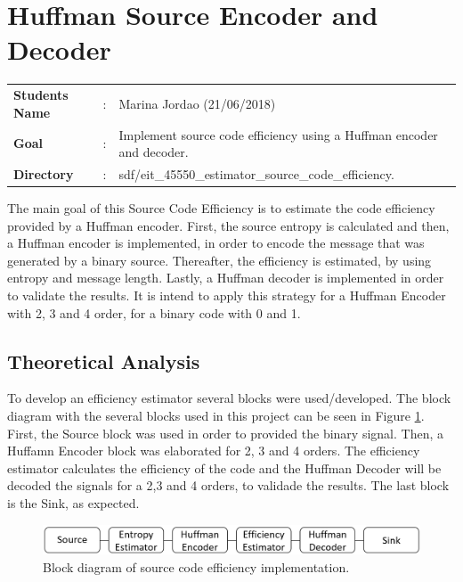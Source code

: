 \clearpage
\section{Huffman Source Encoder and Decoder}

\begin{refsection}

\begin{tcolorbox}	
\begin{tabular}{p{2.75cm} p{0.2cm} p{10.5cm}} 	
\textbf{Students Name}  &:& Marina Jordao (21/06/2018)\\
\textbf{Goal}          &:& Implement source code efficiency using a Huffman encoder and decoder.\\
\textbf{Directory}          &:& sdf/eit\_45550\_estimator\_source\_code\_efficiency.
\end{tabular}
\end{tcolorbox}

The main goal of this Source Code Efficiency is to estimate the code efficiency provided by a Huffman encoder. First, the source entropy is calculated and then, a Huffman encoder is implemented, in order to encode the message that was generated by a binary source.
Thereafter, the efficiency is estimated, by using entropy and message length. Lastly, a Huffman decoder is implemented in order to validate the results.
It is intend to apply this strategy for a Huffman Encoder with 2, 3 and 4 order, for a binary code with 0 and 1.


\subsection{Theoretical Analysis}


To develop an efficiency estimator several blocks were used/developed. The block diagram with the several blocks used in this project can be seen in  Figure \ref{f:RF_C}.
First, the Source block was used in order to provided the binary signal. Then, a Huffamn Encoder block was elaborated for 2, 3 and 4 orders. The efficiency estimator calculates the efficiency of the code and the Huffman Decoder will be decoded the signals for a 2,3 and 4 orders, to validade the results. The last block is the Sink, as expected.



\begin{figure}[!h]
\centering
\includegraphics[width=6in]{./sdf/eit_45550_estimator_source_code_efficiency/figures/blockdiagram.png}
\caption[Block diagram of communication system]{Block diagram of source code efficiency implementation.}
\label{f:RF_C}
\end{figure}


\end{refsection}
